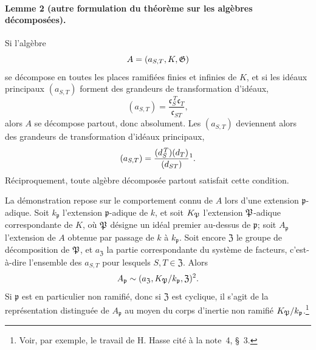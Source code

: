 \paragraph{Lemme 2 (autre formulation du théorème sur les algèbres décomposées).}
Si l'algèbre
\[
        A=(a_{S,T},K,\mathfrak G)
\]
se décompose en toutes les places ramifiées finies et infinies de \(K\), et si les idéaux principaux \((a_{S,T})\) forment des grandeurs de transformation d'idéaux,
\[
        (a_{S,T})
        =\frac{\mathfrak c_S^{\,T}\mathfrak c_T}{\mathfrak c_{ST}},
\]
alors \(A\) se décompose partout, donc absolument. Les \((a_{S,T})\) deviennent alors des grandeurs de transformation d'idéaux principaux,
\[
        (a_{S,T})=\frac{(d_S^{\,T})(d_T)}{(d_{ST})}\text{\footnotemark}.
\]
Réciproquement, toute algèbre décomposée partout satisfait cette condition.

La démonstration repose sur le comportement connu de \(A\) lors d'une extension \(\mathfrak p\)-adique. Soit \(k_{\mathfrak p}\) l'extension \(\mathfrak p\)-adique de \(k\), et soit \(K_\mathfrak P\) l'extension \(\mathfrak P\)-adique correspondante de \(K\), où \(\mathfrak P\) désigne un idéal premier au-dessus de \(\mathfrak p\); soit \(A_{\mathfrak p}\) l'extension de \(A\) obtenue par passage de \(k\) à \(k_{\mathfrak p}\). Soit encore \(\mathfrak Z\) le groupe de décomposition de \(\mathfrak P\), et \(a_{\mathfrak Z}\) la partie correspondante du système de facteurs, c'est-à-dire l'ensemble des \(a_{S,T}\) pour lesquels \(S,T\in\mathfrak Z\). Alors
\[
        A_{\mathfrak p}\sim
        (a_{\mathfrak Z},K_\PP/k_{\mathfrak p},\mathfrak Z)\text{\footnotemark}.
\]
Si \(\mathfrak p\) est en particulier non ramifié, donc si \(\mathfrak Z\) est cyclique, il s'agit de la représentation distinguée de \(A_{\mathfrak p}\) au moyen du corps d'inertie non ramifié \(K_\mathfrak P/k_{\mathfrak p}\).\footnote{Voir, par exemple, le travail de H. Hasse cité à la note~4, §~3.}


